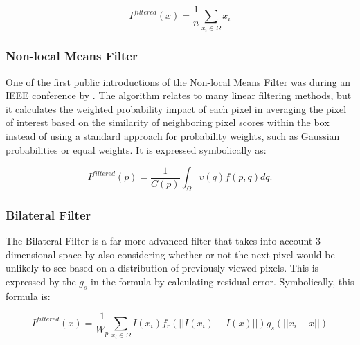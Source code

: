 \documentclass{ncjms}
\begin{document}
\begin{equation}
    I^{filtered}(x)=\frac{1}{n}\sum_{x_i\in \Omega}x_i
\end{equation}


\subsubsection{Non-local Means Filter}
One of the first public introductions of the Non-local Means Filter was during an IEEE conference by \cite{baudes}. The algorithm relates to many linear filtering methods, but it calculates the weighted probability impact of each pixel in averaging the pixel of interest based on the similarity of neighboring pixel scores within the box instead of using a standard approach for probability weights, such as Gaussian probabilities or equal weights. It is expressed symbolically as:

\begin{equation}
    I^{filtered}(p)=\frac{1}{C(p)}\int_{\Omega}v(q)f(p,q)dq.
\end{equation}


\subsubsection{Bilateral Filter}
The Bilateral Filter is a far more advanced filter that takes into account 3-dimensional space by also considering whether or not the next pixel would be unlikely to see based on a distribution of previously viewed pixels. This is expressed by the $g_s$ in the formula by calculating residual error. Symbolically, this formula is:

\begin{equation}
    I^{filtered}(x)=\frac{1}{W_p}\sum_{x_{i}\in \Omega}I(x_i)f_r(||I(x_i)-I(x)||)g_s(||x_i-x||)
\end{equation}

\end{document}
